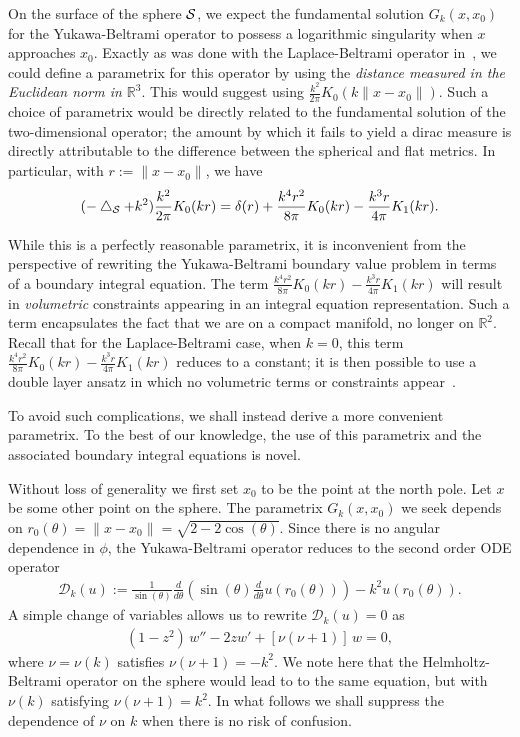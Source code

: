 On the surface of the sphere $\S$, we expect the fundamental solution
$G_k(x,x_{0})$ for the Yukawa-Beltrami operator to possess a
logarithmic singularity when $x$ approaches $x_{0}$. Exactly as was
done  with the Laplace-Beltrami operator in~\cite{gemmrich}, we could
define a parametrix for this operator by using the {\it distance
measured in the Euclidean norm in $\mathbb{R}^3$}. This would suggest
using $ \frac{k^2}{2\pi}K_0(k\|x-x_{0}\|)$.  Such a choice of
parametrix would be directly related to the fundamental solution of the
two-dimensional operator; the amount by which it fails to yield a dirac
measure is directly attributable to the difference between the
spherical and flat metrics.  In particular, with $r:=\|x-x_{0}\|$, we
have
\begin{align*}
  (-\lap_{\S} + k^{2})\frac{k^2}{2\pi}K_0(kr) = \delta(r) 
  +\frac{k^{4}r^{2}}{8\pi}K_{0}(kr) - \frac{k^{3}r}{4\pi}K_{1}(kr).
\end{align*}

While this is a perfectly reasonable parametrix, it is inconvenient
from the perspective of rewriting the Yukawa-Beltrami boundary value
problem in terms of a boundary integral equation. The term
$\frac{k^{4}r^{2}}{8\pi}K_{0}(kr) - \frac{k^{3}r}{4\pi}K_{1}(kr)$ will
result in {\it volumetric} constraints  appearing in an integral
equation representation. Such a term encapsulates the fact that we are
on a compact manifold, no longer on $\mathbb{R}^2$. Recall that for the
Laplace-Beltrami case, when $k=0$, this term
$\frac{k^{4}r^{2}}{8\pi}K_{0}(kr) - \frac{k^{3}r}{4\pi}K_{1}(kr)$
reduces to a constant; it is then possible to use a double layer ansatz
in which no volumetric terms or constraints appear~\cite{kro:nig2013}.  

To avoid such complications, we shall instead derive a more convenient
parametrix. To the best of our knowledge, the use of this parametrix
and the associated boundary integral equations is novel. 

Without loss of generality we first set $x_{0}$ to be the point at the
north pole.  Let $x$ be some other point on the sphere. The parametrix
$G_k(x,x_0)$ we seek depends on
$r_0(\theta)=\|x-x_0\|=\sqrt{2-2\cos(\theta)}$. Since there is no
angular dependence in $\phi$, the Yukawa-Beltrami operator reduces to
the second order ODE operator
\begin{align*}
  \mathcal{D}_k(u) := \frac{1}{\sin(\theta)}
  \frac{d}{d\theta}\left(\sin(\theta)
  \frac{d}{d\theta}u(r_0(\theta))\right)-k^2 u(r_{0}(\theta)).
\end{align*}
A simple change of variables allows us to rewrite $\mathcal{D}_k (u)=0$
as 
\begin{align}
  (1-z^2)\,w'' -2zw' + \left[\nu(\nu+1)\right]\,w = 0,
  \label{LegendrePequation}
\end{align}
where $\nu = \nu(k)$ satisfies $\nu(\nu + 1) = -k^2$. We note here that
the Helmholtz-Beltrami operator on the sphere would lead to to the same
equation, but with $\nu(k)$ satisfying $\nu(\nu+1)=k^{2}$. In what
follows we shall suppress the dependence of $\nu$ on $k$ when there is
no risk of confusion.

